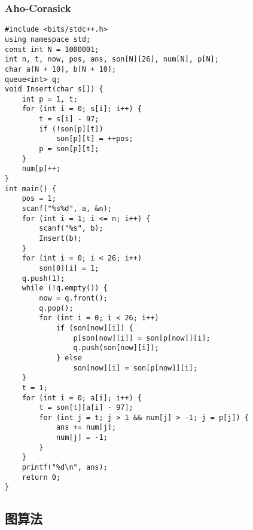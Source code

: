 \documentclass[a4paper]{article}
\begin{document}
\subsubsection{Aho-Corasick}
\begin{lstlisting}
#include <bits/stdc++.h>
using namespace std;
const int N = 1000001;
int n, t, now, pos, ans, son[N][26], num[N], p[N];
char a[N + 10], b[N + 10];
queue<int> q;
void Insert(char s[]) {
    int p = 1, t;
    for (int i = 0; s[i]; i++) {
        t = s[i] - 97;
        if (!son[p][t])
            son[p][t] = ++pos;
        p = son[p][t];
    }
    num[p]++;
}
int main() {
    pos = 1;
    scanf("%s%d", a, &n);
    for (int i = 1; i <= n; i++) {
        scanf("%s", b);
        Insert(b);
    }
    for (int i = 0; i < 26; i++)
        son[0][i] = 1;
    q.push(1);
    while (!q.empty()) {
        now = q.front();
        q.pop();
        for (int i = 0; i < 26; i++)
            if (son[now][i]) {
                p[son[now][i]] = son[p[now]][i];
                q.push(son[now][i]);
            } else
                son[now][i] = son[p[now]][i];
    }
    t = 1;
    for (int i = 0; a[i]; i++) {
        t = son[t][a[i] - 97];
        for (int j = t; j > 1 && num[j] > -1; j = p[j]) {
            ans += num[j];
            num[j] = -1;
        }
    }
    printf("%d\n", ans);
    return 0;
}
\end{lstlisting}
\subsection{图算法}
\end{document}
